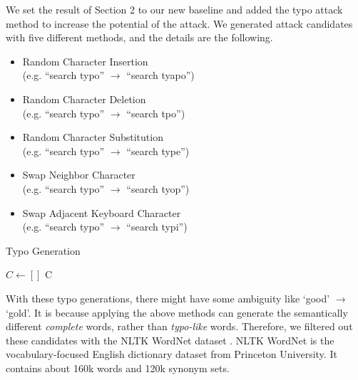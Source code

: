 \documentclass[11pt,a4paper]{article}
\begin{document}
We set the result of Section 2 to our new baseline and added the typo attack method to increase the potential of the attack.
We generated attack candidates with five different methods, and the details are the following.

\begin{itemize}
    \item Random Character Insertion     \\ (e.g. ``search typo'' $\rightarrow$ ``search tyapo'')
    \item Random Character Deletion      \\ (e.g. ``search typo'' $\rightarrow$ ``search tpo'')
    \item Random Character Substitution  \\ (e.g. ``search typo'' $\rightarrow$ ``search type'')
    \item Swap Neighbor Character        \\ (e.g. ``search typo'' $\rightarrow$ ``search tyop'')
    \item Swap Adjacent Keyboard Character \\ (e.g. ``search typo'' $\rightarrow$ ``search typi'')
\end{itemize}

\begin{algorithm}[hbt!]
    \centering
    \caption{Typo Generation}
    \label{alg:Typo}
    \begin{algorithmic}[1]
    
        \State \Return []
    \EndIf
    \State $C\gets [ ]$ 
        \EndIf
    \EndWhile
    \State \Return C
    \EndProcedure
    
    \end{algorithmic}
    
\end{algorithm}

With these typo generations, there might have some ambiguity like `good' $\rightarrow$ `gold'.
It is because applying the above methods can generate the semantically different \textit{complete} words, rather than \textit{typo-like} words. Therefore, we filtered out these candidates with the NLTK WordNet dataset \cite{Princeton_2010}.
NLTK WordNet is the vocabulary-focused English dictionary dataset from Princeton University.
It contains about 160k words and 120k synonym sets.
\end{document}
